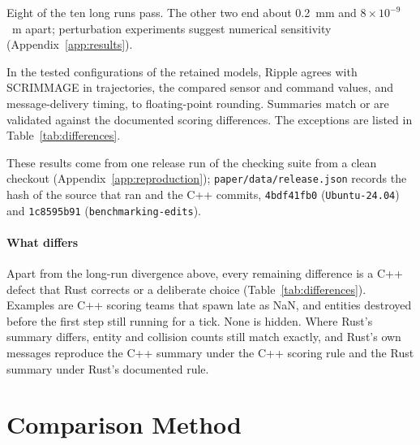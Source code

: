 \documentclass[conference]{IEEEtran}
\begin{document}
Eight of the ten long runs pass. The other two end about 0.2~mm and
$8\times10^{-9}$~m apart; perturbation experiments suggest numerical
sensitivity (Appendix~\ref{app:results}).

In the tested configurations of the retained models,
Ripple agrees with SCRIMMAGE in trajectories, the compared sensor and
command values, and message-delivery timing, to floating-point rounding.
Summaries match or are validated against the documented scoring differences.
The exceptions are listed in Table~\ref{tab:differences}.

These results come from one release run of the checking suite from a clean
checkout (Appendix~\ref{app:reproduction}); \texttt{paper/data/release.json}
records the hash of the source that ran and the C++ commits, \texttt{4bdf41fb0}
(\texttt{Ubuntu-24.04}) and \texttt{1c8595b91} (\texttt{benchmarking-edits}).



\paragraph{What differs}
Apart from the long-run divergence above, every remaining difference
is a C++ defect that Rust corrects or a deliberate choice
(Table~\ref{tab:differences}). Examples are C++ scoring teams that spawn
late as NaN, and entities destroyed before the first step still running for a
tick. None is hidden. Where Rust's summary differs, entity and collision counts
still match exactly, and Rust's own messages reproduce the C++ summary under the
C++ scoring rule and the Rust summary under Rust's documented rule.

\section{Comparison Method}
\label{app:method}
\end{document}
